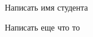 
\begin{DoxyRefList}
\item[\label{todo__todo000001}%
\Hypertarget{todo__todo000001}%
Файл \mbox{\hyperlink{main_8c}{main.c}} ]Написать имя студента 

Написать еще что то 
\end{DoxyRefList}